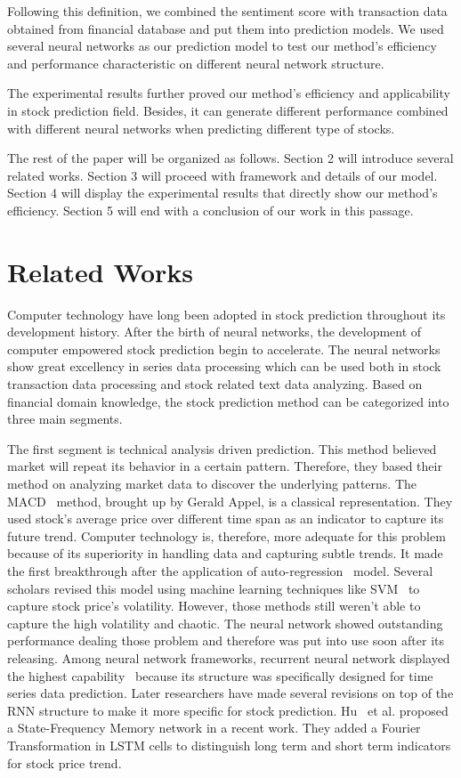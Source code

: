 \documentclass[runningheads]{llncs}
\begin{document}
Following this definition, we combined the sentiment score with transaction data obtained from financial database and put them into prediction models. We used several neural networks as our prediction model to test our method's efficiency and performance characteristic on different neural network structure. 

The experimental results further proved our method's efficiency and applicability in stock prediction field. Besides, it can generate different performance combined with different neural networks when predicting different type of stocks.

The rest of the paper will be organized as follows. Section 2 will introduce several related works. Section 3 will proceed with framework and details of our model. Section 4 will display the experimental results that directly show our method's efficiency. Section 5 will end with a conclusion of our work in this passage.

\section{Related Works}
Computer technology have long been adopted in stock prediction throughout its development history. After the birth of neural networks, the development of computer empowered stock prediction begin to accelerate. The neural networks show great excellency in series data processing which can be used both in stock transaction data processing and stock related text data analyzing. Based on financial domain knowledge, the stock prediction method can be categorized into three main segments.

The first segment is technical analysis driven prediction. This method believed market will repeat its behavior in a certain pattern. Therefore, they based their method on analyzing market data to discover the underlying patterns. The MACD~\cite{MACD} method, brought up by Gerald Appel, is a classical representation. They used stock's average price over different time span as an indicator to capture its future trend. Computer technology is, therefore, more adequate for this problem because of its superiority in handling data and capturing subtle trends. It made the first breakthrough after the 
application of auto-regression~\cite{autoregression} model. Several scholars revised this model using machine learning techniques like SVM~\cite{ML-autoregression} to capture stock price's volatility. However, those methods still weren't able to capture the high volatility and chaotic. The neural network showed outstanding performance dealing those problem and therefore was put into use soon after its releasing. Among neural network frameworks, recurrent neural network displayed the highest capability~\cite{neuralnetwork} because its structure was specifically designed for time series data prediction. Later researchers have made several revisions on top of the RNN structure to make it more specific for stock prediction. Hu~\cite{SFM} et al. proposed a State-Frequency Memory network in a recent work. They added a Fourier Transformation in LSTM cells to distinguish long term and short term indicators for stock price trend. 
\end{document}

